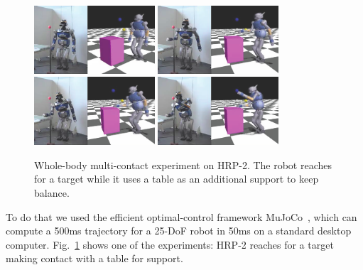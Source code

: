\begin{figure}[!tbp]
\begin{center}
	\includegraphics[width=0.4\textwidth]{figures/mujoco/ss0.png} \quad
	\includegraphics[width=0.4\textwidth]{figures/mujoco/ss1.png} \\
	\includegraphics[width=0.4\textwidth]{figures/mujoco/ss2.png} \quad
	\includegraphics[width=0.4\textwidth]{figures/mujoco/ss3.png}
	\caption{Whole-body multi-contact experiment on HRP-2. The robot reaches for a target while it uses a table as an additional support to keep balance.}
	\label{fig:mujoco}
\end{center}
\end{figure}
To do that we used the efficient optimal-control framework MuJoCo~\citep{Todorov}, which can compute a 500ms trajectory for a 25-DoF robot in 50ms on a standard desktop computer.
Fig.~\ref{fig:mujoco} shows one of the experiments: HRP-2 reaches for a target making contact with a table for support.


